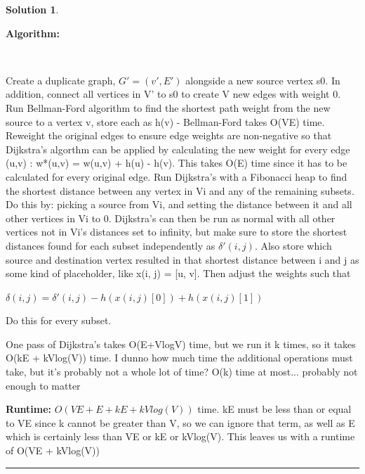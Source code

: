 \documentclass{article}
\theoremstyle{definition}
\def\fline{\rule{0.75\linewidth}{0.5pt}}
\newcommand{\finishline}{\begin{center}\fline\end{center}}
\newtheorem*{solution*}{Solution}
\newenvironment{solution}{\begin{solution*}}{{\finishline} \end{solution*}}
\begin{document}
\begin{solution}

    \

    \textbf{Algorithm: } 
    
    \

    Create a duplicate graph, $G' = (v', E')$ alongside a new source vertex s0. In addition, connect all vertices in V' to s0 to create V new edges with weight 0.
    Run Bellman-Ford algorithm to find the shortest path weight from the new source to a vertex v, store each as h(v) - Bellman-Ford takes O(VE) time.
    Reweight the original edges to ensure edge weights are non-negative so that Dijkstra's algorthm can be applied by calculating the new weight for every edge (u,v) : w*(u,v) = w(u,v) + h(u) - h(v). This takes O(E) time since it has to be calculated for every original edge.
    Run Dijkstra's with a Fibonacci heap to find the shortest distance between any vertex in Vi and any of the remaining subsets. Do this by: picking a source from Vi, and setting the distance between it and all other vertices in Vi to 0. Dijkstra's can then be run as normal with all other vertices not in Vi's distances set to infinity, but make sure to store the shortest distances found for each subset independently as $\delta'(i, j)$. Also store which source and destination vertex resulted in that shortest distance between i and j as some kind of placeholder, like x(i, j) = [u, v]. Then adjust the weights such that

    $\delta(i, j) = \delta'(i, j) - h(x(i, j)[0]) + h(x(i, j)[1])$

    Do this for every subset. 

    One pass of Dijkstra's takes O(E+VlogV) time, but we run it k times, so it takes O(kE + kVlog(V)) time. I dunno how much time the additional operations must take, but it's probably not a whole lot of time? O(k) time at most... probably not enough to matter
    
    \textbf{Runtime: }
        $O(VE + E + kE + kVlog(V))$ time. kE must be less than or equal to VE since k cannot be greater than V, so we can ignore that term, as well as E which is certainly less than VE or kE or kVlog(V). This leaves us with a runtime of O(VE + kVlog(V))

\end{solution}

\newpage
\end{document}
